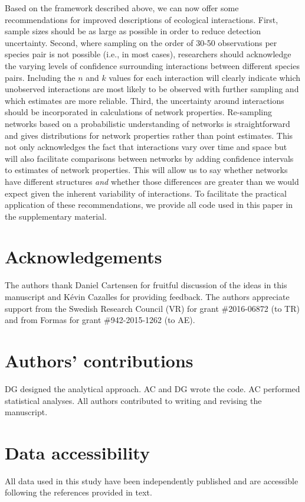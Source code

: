 \documentclass[12pt]{article}
\begin{document}
\begin{spacing}{2.0}
  Based on the framework described above, we can now offer some recommendations for improved descriptions of ecological interactions. First, sample sizes should be as large as possible in order to reduce detection uncertainty. Second, where sampling on the order of 30-50 observations per species pair is not possible (i.e., in most cases), researchers should acknowledge the varying levels of confidence surrounding interactions between different species pairs. Including the $n$ and $k$ values for each interaction will clearly indicate which unobserved interactions are most likely to be observed with further sampling and which estimates are more reliable. Third, the uncertainty around interactions should be incorporated in calculations of network properties. Re-sampling networks based on a probabilistic understanding of networks is straightforward and gives distributions for network properties rather than point estimates. This not only acknowledges the fact that interactions vary over time and space but will also facilitate comparisons between networks by adding confidence intervals to estimates of network properties. This will allow us to say whether networks have different structures \emph{and} whether those differences are greater than we would expect given the inherent variability of interactions. To facilitate the practical application of these recommendations, we provide all code used in this paper in the supplementary material. 


\section*{Acknowledgements}

  The authors thank Daniel Cartensen for fruitful discussion of the ideas in this manuscript and K\'{e}vin Cazalles for providing feedback. The authors appreciate support from the Swedish Research Council (VR) for grant \#2016-06872 (to TR) and from Formas for grant \#942-2015-1262 (to AE).


\section*{Authors' contributions}

DG designed the analytical approach. AC and DG wrote the code. AC performed statistical analyses. All authors contributed to writing and revising the manuscript.


\section*{Data accessibility}

All data used in this study have been independently published and are accessible following the references provided in text.



\end{spacing}
\clearpage
\end{document}
